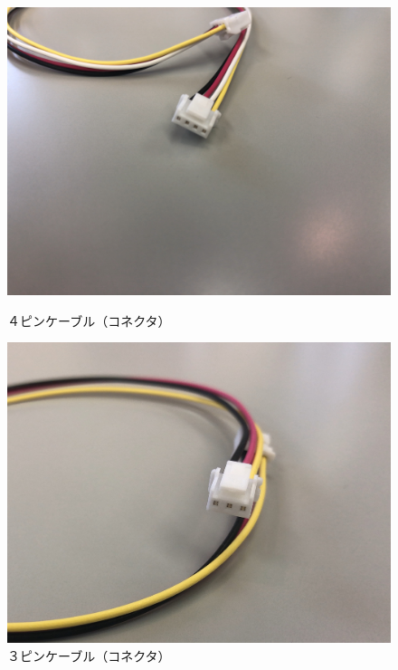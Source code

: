 \begin{figure}[H]
  \begin{minipage}[t]{0.48\columnwidth}
    \centering
    \includegraphics[width=0.8\hsize]{images/chap05/text05-img014.jpg}
    \caption{４ピンケーブル（コネクタ）}
  \end{minipage}
  \hspace{0.04\columnwidth} %
  \begin{minipage}[t]{0.48\columnwidth}
    \centering
    \includegraphics[width=0.8\hsize]{images/chap05/text05-img015.jpg}
    \caption{３ピンケーブル（コネクタ）}
  \end{minipage}
\end{figure}











